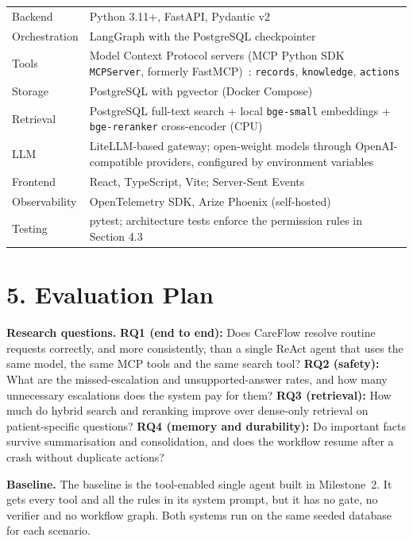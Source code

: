 \documentclass[11pt,a4paper]{article}
\begin{document}
\begin{center}
\small
\begin{tabularx}{\textwidth}{>{\raggedright\arraybackslash}p{3.2cm} L}
\toprule
Backend & Python 3.11+, FastAPI, Pydantic v2 \\
Orchestration & LangGraph with the PostgreSQL checkpointer \\
Tools & Model Context Protocol servers (MCP Python SDK \texttt{MCPServer}, formerly FastMCP)~\cite{mcp}: \texttt{records}, \texttt{knowledge}, \texttt{actions} \\
Storage & PostgreSQL with pgvector (Docker Compose) \\
Retrieval & PostgreSQL full-text search + local \texttt{bge-small} embeddings + \texttt{bge-reranker} cross-encoder (CPU) \\
LLM & LiteLLM-based gateway; open-weight models through OpenAI-compatible providers, configured by environment variables \\
Frontend & React, TypeScript, Vite; Server-Sent Events \\
Observability & OpenTelemetry SDK, Arize Phoenix (self-hosted) \\
Testing & pytest; architecture tests enforce the permission rules in Section 4.3 \\
\bottomrule
\end{tabularx}
\end{center}

\section*{5. Evaluation Plan}

\textbf{Research questions.}
\textbf{RQ1 (end to end):} Does CareFlow resolve routine requests correctly, and more consistently, than a single ReAct agent that uses the same model, the same MCP tools and the same search tool?
\textbf{RQ2 (safety):} What are the missed-escalation and unsupported-answer rates, and how many unnecessary escalations does the system pay for them?
\textbf{RQ3 (retrieval):} How much do hybrid search and reranking improve over dense-only retrieval on patient-specific questions?
\textbf{RQ4 (memory and durability):} Do important facts survive summarisation and consolidation, and does the workflow resume after a crash without duplicate actions?

\textbf{Baseline.} The baseline is the tool-enabled single agent built in Milestone~2. It gets every tool and all the rules in its system prompt, but it has no gate, no verifier and no workflow graph. Both systems run on the same seeded database for each scenario.
\end{document}
